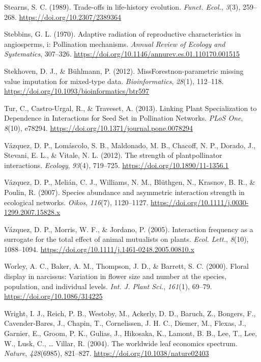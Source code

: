 \documentclass[
  12pt,
  a4paper,
]{article}
\newlength{\cslhangindent}
\newlength{\cslentryspacingunit} %
\newenvironment{CSLReferences}[2] %
 {%
  \setlength{\parindent}{0pt}
  \ifodd #1
  \let\oldpar\par
  \def\par{\hangindent=\cslhangindent\oldpar}
  \fi
  \setlength{\parskip}{#2\cslentryspacingunit}
 }%
 {}
\begin{document}
\begin{CSLReferences}{1}{0}
\leavevmode{}%
Stearns, S. C. (1989). Trade-offs in life-history evolution. \emph{Funct. Ecol.}, \emph{3}(3), 259--268. \url{https://doi.org/10.2307/2389364}

\leavevmode{}%
Stebbins, G. L. (1970). Adaptive radiation of reproductive characteristics in angiosperms, i: Pollination mechanisms. \emph{Annual Review of Ecology and Systematics}, 307--326. \url{https://doi.org/10.1146/annurev.es.01.110170.001515}

\leavevmode{}%
Stekhoven, D. J., \& Bühlmann, P. (2012). {MissForest}\textemdash non-parametric missing value imputation for mixed-type data. \emph{Bioinformatics}, \emph{28}(1), 112--118. \url{https://doi.org/10.1093/bioinformatics/btr597}

\leavevmode{}%
Tur, C., Castro-Urgal, R., \& Traveset, A. (2013). Linking {Plant Specialization} to {Dependence} in {Interactions} for {Seed Set} in {Pollination Networks}. \emph{PLoS One}, \emph{8}(10), e78294. \url{https://doi.org/10.1371/journal.pone.0078294}

\leavevmode{}%
Vázquez, D. P., Lomáscolo, S. B., Maldonado, M. B., Chacoff, N. P., Dorado, J., Stevani, E. L., \& Vitale, N. L. (2012). The strength of plant\textendash pollinator interactions. \emph{Ecology}, \emph{93}(4), 719--725. \url{https://doi.org/10.1890/11-1356.1}

\leavevmode{}%
Vázquez, D. P., Melián, C. J., Williams, N. M., Blüthgen, N., Krasnov, B. R., \& Poulin, R. (2007). Species abundance and asymmetric interaction strength in ecological networks. \emph{Oikos}, \emph{116}(7), 1120--1127. \url{https://doi.org/10.1111/j.0030-1299.2007.15828.x}

\leavevmode{}%
Vázquez, D. P., Morris, W. F., \& Jordano, P. (2005). Interaction frequency as a surrogate for the total effect of animal mutualists on plants. \emph{Ecol. Lett.}, \emph{8}(10), 1088--1094. \url{https://doi.org/10.1111/j.1461-0248.2005.00810.x}

\leavevmode{}%
Worley, A. C., Baker, A. M., Thompson, J. D., \& Barrett, S. C. (2000). Floral display in narcissus: Variation in flower size and number at the species, population, and individual levels. \emph{Int. J. Plant Sci.}, \emph{161}(1), 69--79. \url{https://doi.org/10.1086/314225}

\leavevmode{}%
Wright, I. J., Reich, P. B., Westoby, M., Ackerly, D. D., Baruch, Z., Bongers, F., Cavender-Bares, J., Chapin, T., Cornelissen, J. H. C., Diemer, M., Flexas, J., Garnier, E., Groom, P. K., Gulias, J., Hikosaka, K., Lamont, B. B., Lee, T., Lee, W., Lusk, C., \ldots{} Villar, R. (2004). The worldwide leaf economics spectrum. \emph{Nature}, \emph{428}(6985), 821--827. \url{https://doi.org/10.1038/nature02403}

\end{CSLReferences}
\end{document}
